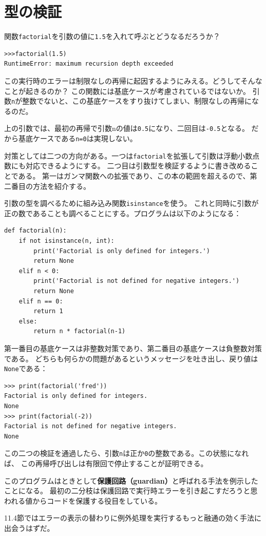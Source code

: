 \documentclass[a4j,12pt,makeidx]{jbook}
\begin{document}
\section{型の検証}
関数{\tt factorial}を引数の値に{\tt 1.5}を入れて呼ぶとどうなるだろうか？
\begin{verbatim}
>>>factorial(1.5)
RuntimeError: maximum recursion depth exceeded 
\end{verbatim}
この実行時のエラーは制限なしの再帰に起因するようにみえる。どうしてそんなことが起きるのか？
この関数には基底ケースが考慮されているではないか。
引数{\tt n}が整数でないと、この基底ケースをすり抜けてしまい、制限なしの再帰になるのだ。\par
上の引数では、最初の再帰で引数nの値は{\tt 0.5}になり、二回目は{\tt -0.5}となる。
だから基底ケースである{\tt n=0}は実現しない。\par
対策としては二つの方向がある。一つは{\tt factorial}を拡張して引数は浮動小数点数にも対応できるようにする。
二つ目は引数型を検証するように書き改めることである。
第一はガンマ関数への拡張であり、この本の範囲を超えるので、第二番目の方法を紹介する。\par
引数の型を調べるために組み込み関数{\tt isinstance}を使う。
これと同時に引数が正の数であることも調べることにする。プログラムは以下のようになる：
\begin{verbatim}
def factorial(n):
    if not isinstance(n, int):
        print('Factorial is only defined for integers.')
        return None
    elif n < 0:
        print('Factorial is not defined for negative integers.')
        return None
    elif n == 0:
        return 1
    else:
        return n * factorial(n-1)
\end{verbatim}
第一番目の基底ケースは非整数対策であり、第二番目の基底ケースは負整数対策である。
どちらも何らかの問題があるというメッセージを吐き出し、戻り値は{\tt None}である：
\begin{verbatim}
>>> print(factorial('fred'))
Factorial is only defined for integers.
None
>>> print(factorial(-2))
Factorial is not defined for negative integers.
None
\end{verbatim}
この二つの検証を通過したら、引数{\tt n}は正か{\tt 0}の整数である。この状態になれば、
この再帰呼び出しは有限回で停止することが証明できる。\par
このプログラムはときとして{\bf 保護回路（guardian）}と呼ばれる手法を例示したことになる。
最初の二分枝は保護回路で実行時エラーを引き起こすだろうと思われる値からコードを保護する役目をしている。 \par
11.4節ではエラーの表示の替わりに例外処理を実行するもっと融通の効く手法に出会うはずだ。
%
\end{document}
